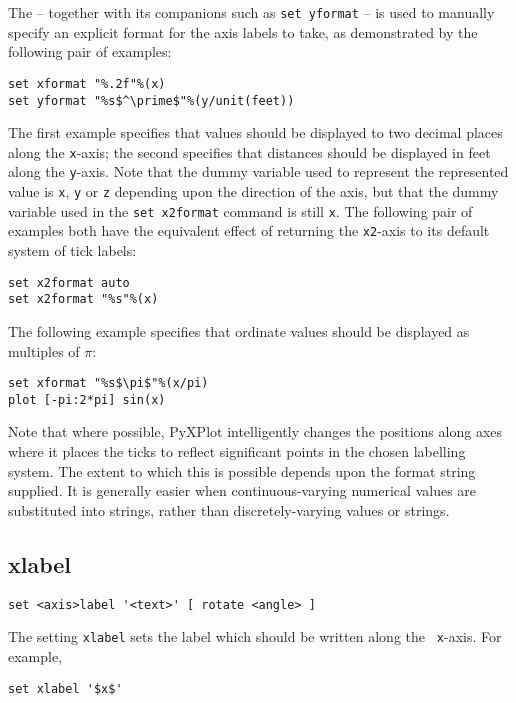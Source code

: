 The  -- together with its companions such as {\tt set
yformat} -- is used to manually specify an explicit format for the axis labels
to take, as demonstrated by the following pair of examples:
\begin{verbatim}
set xformat "%.2f"%(x)
set yformat "%s$^\prime$"%(y/unit(feet))
\end{verbatim}
The first example specifies that values should be displayed to two
decimal places along the {\tt x}-axis; the second specifies that distances should
be displayed in feet along the {\tt y}-axis. Note that the dummy variable used to
represent the represented value is {\tt x}, {\tt y} or {\tt z} depending upon the
direction of the axis, but that the dummy variable used in the {\tt set
x2format} command is still {\tt x}. The following pair of examples both have
the equivalent effect of returning the {\tt x2}-axis to its default system of
tick labels:
\begin{verbatim}
set x2format auto
set x2format "%s"%(x)
\end{verbatim}

The following example specifies that ordinate values should be displayed as
multiples of $\pi$:
\begin{verbatim}
set xformat "%s$\pi$"%(x/pi)
plot [-pi:2*pi] sin(x)
\end{verbatim}

Note that where possible, PyXPlot intelligently changes the positions along
axes where it places the ticks to reflect significant points in the chosen
labelling system.  The extent to which this is possible depends upon the format
string supplied. It is generally easier when continuous-varying numerical
values are substituted into strings, rather than discretely-varying values or
strings.

\subsection{xlabel}

\begin{verbatim}
set <axis>label '<text>' [ rotate <angle> ]
\end{verbatim}

The setting {\tt xlabel} sets the label which should be written along the {\tt
x}-axis.  For example,

\begin{verbatim}
set xlabel '$x$'
\end{verbatim}

